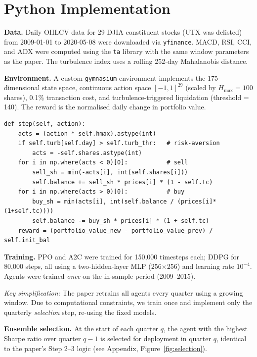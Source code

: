 \documentclass[11pt,a4paper]{article}
\begin{document}
\section{Python Implementation}

\textbf{Data.}
Daily OHLCV data for 29 DJIA constituent stocks (UTX was delisted) from
2009-01-01 to 2020-05-08 were downloaded via \texttt{yfinance}.
MACD, RSI, CCI, and ADX were computed using the \texttt{ta} library with the
same window parameters as the paper. The turbulence index uses a rolling
252-day Mahalanobis distance.

\textbf{Environment.}
A custom \texttt{gymnasium} environment implements the 175-dimensional state
space, continuous action space $[-1,1]^{29}$ (scaled by $H_{\max}=100$
shares), 0.1\% transaction cost, and turbulence-triggered liquidation
(threshold = 140). The reward is the normalised daily change in portfolio value.

\begin{lstlisting}[caption={Environment step: sells first then buys; turbulence guard liquidates all holdings.}]
def step(self, action):
    acts = (action * self.hmax).astype(int)
    if self.turb[self.day] > self.turb_thr:   # risk-aversion
        acts = -self.shares.astype(int)
    for i in np.where(acts < 0)[0]:           # sell
        sell_sh = min(-acts[i], int(self.shares[i]))
        self.balance += sell_sh * prices[i] * (1 - self.tc)
    for i in np.where(acts > 0)[0]:           # buy
        buy_sh = min(acts[i], int(self.balance / (prices[i]*(1+self.tc))))
        self.balance -= buy_sh * prices[i] * (1 + self.tc)
    reward = (portfolio_value_new - portfolio_value_prev) / self.init_bal
\end{lstlisting}

\textbf{Training.}
PPO and A2C were trained for 150,000 timesteps each; DDPG for 80,000 steps,
all using a two-hidden-layer MLP (256$\times$256) and learning rate $10^{-4}$.
Agents were trained \emph{once} on the in-sample period (2009--2015).

\textit{Key simplification:} The paper retrains all agents every quarter using
a growing window. Due to computational constraints, we train once and implement
only the quarterly \emph{selection} step, re-using the fixed models.

\textbf{Ensemble selection.}
At the start of each quarter $q$, the agent with the highest Sharpe ratio over
quarter $q-1$ is selected for deployment in quarter $q$, identical to the
paper's Step 2--3 logic (see Appendix, Figure~\ref{fig:selection}).
\end{document}
